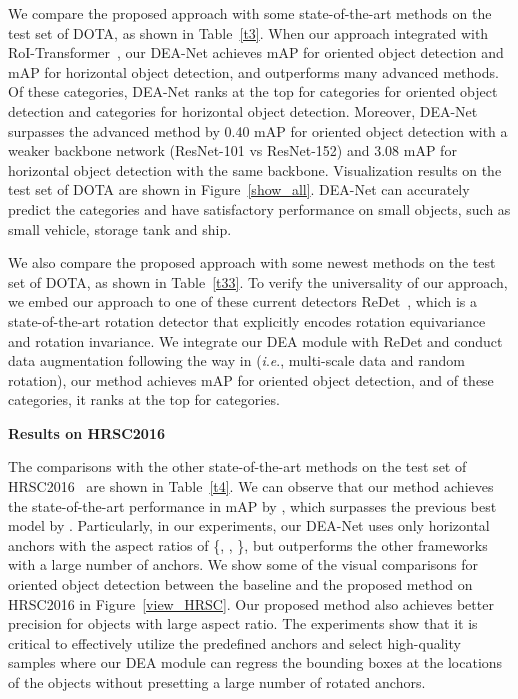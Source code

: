 \documentclass[journal]{IEEEtran}
\newcommand{\myparagraph}[1]{\vspace{0.1em}\noindent\textbf{#1}}
\newcommand{\ie}{\textit{i}.\textit{e}.}
\begin{document}
We compare the proposed approach with some state-of-the-art methods on the test set of DOTA, as shown in Table~\ref{t3}. When our approach integrated with RoI-Transformer~\cite{ding2019learning}, our DEA-Net achieves  mAP for oriented object detection and  mAP for horizontal object detection, and outperforms many advanced methods. Of these  categories, DEA-Net ranks at the top for  categories for oriented object detection and  categories for horizontal object detection. Moreover, DEA-Net surpasses the advanced method by 0.40 mAP for oriented object detection with a weaker backbone network (ResNet-101 vs ResNet-152) and 3.08 mAP for horizontal object detection with the same backbone. Visualization results on the test set of DOTA are shown in Figure~\ref{show_all}. DEA-Net can accurately predict the categories and have satisfactory performance on small objects, such as small vehicle, storage tank and ship.


We also compare the proposed approach with some newest methods on the test set of DOTA, as shown in Table~\ref{t33}. To verify the universality of our approach, we embed our approach to one of these current detectors ReDet~\cite{han2021redet}, which is a state-of-the-art rotation detector that explicitly encodes rotation equivariance and rotation invariance. We integrate our DEA module with ReDet and conduct data augmentation following the way in \cite{han2021redet} (\ie, multi-scale data and random rotation), our method achieves   mAP for oriented object detection, and of these  categories, it ranks at the top for  categories.




\myparagraph{Results on HRSC2016} 

The comparisons with the other state-of-the-art methods on the test set of HRSC2016~\cite{lb2017high} are shown in Table~\ref{t4}. We can observe that our method achieves the state-of-the-art performance in mAP by , which surpasses the previous best model by . Particularly, in our experiments, our DEA-Net uses only  horizontal anchors with the aspect ratios of \{, , \}, but outperforms the other frameworks with a large number of anchors. We show some of the visual comparisons for oriented object detection between the baseline and the proposed method on HRSC2016 in Figure~\ref{view_HRSC}. Our proposed method also achieves better precision for objects with large aspect ratio. The experiments show that it is critical to effectively utilize the predefined anchors and select high-quality samples where our DEA module can regress the bounding boxes at the locations of the objects without presetting a large number of rotated anchors. 
\end{document}
